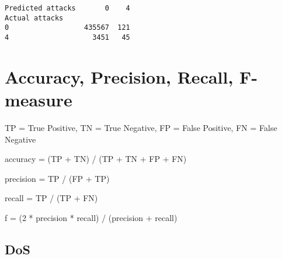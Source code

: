 \documentclass[11pt]{article}
\makeatletter
\newcommand{\boxspacing}{\kern\kvtcb@left@rule\kern\kvtcb@boxsep}
\newcommand{\prompt}[4]{
        {\ttfamily\llap{{\color{#2}[#3]:\hspace{3pt}#4}}\vspace{-\baselineskip}}
    }
\makeatother
\begin{document}
            \begin{tcolorbox}[breakable, size=fbox, boxrule=.5pt, pad at break*=1mm, opacityfill=0]
\prompt{Out}{outcolor}{79}{\boxspacing}
\begin{Verbatim}[commandchars=\\\{\}]
Predicted attacks       0    4
Actual attacks
0                  435567  121
4                    3451   45
\end{Verbatim}
\end{tcolorbox}
        
    \hypertarget{accuracy-precision-recall-f-measure}{%
\section{Accuracy, Precision, Recall,
F-measure}\label{accuracy-precision-recall-f-measure}}

    TP = True Positive, TN = True Negative, FP = False Positive, FN = False
Negative

accuracy = (TP + TN) / (TP + TN + FP + FN)

precision = TP / (FP + TP)

recall = TP / (TP + FN)

f = (2 * precision * recall) / (precision + recall)

    \hypertarget{dos}{%
\subsection{DoS}\label{dos}}
\end{document}
